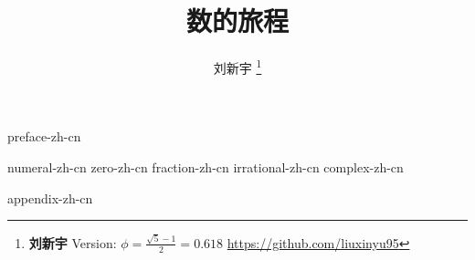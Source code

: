\documentclass[zihao=5, b5paper, twoside, heading=true, punct=kaiming]{ctexbook}
\begin{document}


\title{
  {\bf \Huge 数的旅程}
  \centering
}

\author{刘新宇
  \thanks{{\bfseries 刘新宇} \newline
    Version: $\displaystyle \phi = \frac{\sqrt{5} - 1}{2} = 0.618$ \newline
    \url{https://github.com/liuxinyu95} \newline
    }}

\maketitle

\frontmatter
{preface-zh-cn}
\newpage

\tableofcontents

\mainmatter

{numeral-zh-cn}
{zero-zh-cn}
{fraction-zh-cn}
{irrational-zh-cn}
{complex-zh-cn}

\appendix
{appendix-zh-cn}

\backmatter
{}
{}
\printindex

\end{document}
